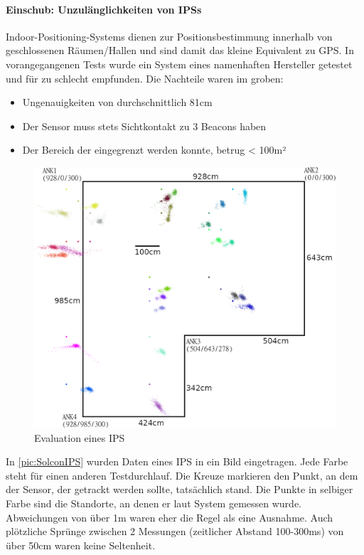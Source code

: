 \paragraph*{Einschub: Unzulänglichkeiten von IPSs}\label{subsubsec:IPS}

Indoor-Positioning-Systems dienen zur Positionsbestimmung innerhalb von geschlossenen Räumen/Hallen und sind damit das kleine Equivalent zu GPS. In vorangegangenen Tests wurde ein System eines namenhaften Hersteller getestet und für zu schlecht empfunden. Die Nachteile waren im groben:

\begin{itemize}
	\item Ungenauigkeiten von durchschnittlich 81cm
	\item Der Sensor muss stets Sichtkontakt zu 3 Beacons haben
	\item Der Bereich der eingegrenzt werden konnte, betrug < 100m²
\end{itemize}

\begin{figure}
	\includegraphics[width=\pictureWidthBig,keepaspectratio]{graphics/Solcon/old.png}
	\caption{Evaluation eines IPS}
	\label{pic:SolconIPS}
\end{figure}

In \autoref{pic:SolconIPS} wurden Daten eines IPS in ein Bild eingetragen. Jede Farbe steht für einen anderen Testdurchlauf. Die Kreuze markieren den Punkt, an dem der Sensor, der getrackt werden sollte, tatsächlich stand. Die Punkte in selbiger Farbe sind die Standorte, an denen er laut System gemessen wurde. Abweichungen von über 1m waren eher die Regel als eine Ausnahme. Auch plötzliche Sprünge zwischen 2 Messungen (zeitlicher Abstand 100-300ms) von über 50cm waren keine Seltenheit.

